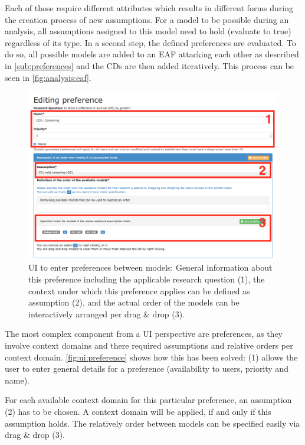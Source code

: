 Each of those require different attributes which results in different forms during the creation process of new assumptions. For a model to be possible during an analysis, all assumptions assigned to this model need to hold (evaluate to true) regardless of its type. In a second step, the defined \glspl{preference} are evaluated. To do so, all possible models are added to an \gls{EAF} attacking each other as described in \autoref{sub:preferences} and the \glspl{CD} are then added iteratively. This process can be seen in \autoref{fig:analysis:eaf}.

\begin{figure}[htb]
	\centering
	\includegraphics[width=\textwidth]{figures/ui_preference}
	\caption{\gls{UI} to enter preferences between models: General information about this preference including the applicable research question (1), the context under which this preference applies can be defined as assumption (2), and the actual order of the models can be interactively arranged per drag \& drop (3).}
	\label{fig:ui:preference}
\end{figure}


The most complex component from a \gls{UI} perspective are preferences, as they involve context domains and there required assumptions and relative orders per context domain. \autoref{fig:ui:preference} shows how this has been solved: (1) allows the user to enter general details for a preference (availability to users, priority and name). 

For each available context domain for this particular preference, an assumption (2) has to be chosen. A context domain will be applied, if and only if this assumption holds. The relatively order between models can be specified easily via drag \& drop (3). 

